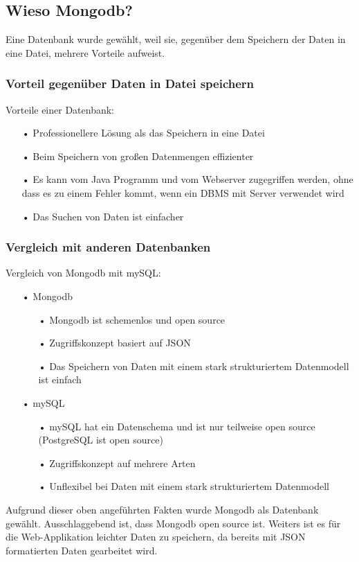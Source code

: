 \subsection{Wieso Mongodb?}
Eine Datenbank wurde gewählt, weil sie, gegenüber dem Speichern der Daten in eine Datei, mehrere Vorteile aufweist. 
\subsubsection{Vorteil gegenüber Daten in Datei speichern}
Vorteile einer Datenbank:
\begin{itemize}
\item[•] Professionellere Lösung als das Speichern in eine Datei
\item[•] Beim Speichern von großen Datenmengen effizienter
\item[•] Es kann vom Java Programm und vom Webserver zugegriffen werden, ohne dass es zu einem Fehler kommt, wenn ein DBMS mit Server verwendet wird
\item[•] Das Suchen von Daten ist einfacher
\end{itemize}
\subsubsection{Vergleich mit anderen Datenbanken}
Vergleich von Mongodb mit mySQL:
\begin{itemize}
\item[•] Mongodb
\begin{itemize}
\item[•] Mongodb ist schemenlos und open source
\item[•] Zugriffskonzept basiert auf \ac{JSON}
\item[•] Das Speichern von Daten mit einem stark strukturiertem Datenmodell ist einfach
\end{itemize}
\item[•] mySQL
\begin{itemize}
\item[•] mySQL hat ein Datenschema und ist nur teilweise open source (PostgreSQL ist open source)
\item[•] Zugriffskonzept auf mehrere Arten
\item[•] Unflexibel bei Daten mit einem stark strukturiertem Datenmodell
\end{itemize}
\end{itemize}

Aufgrund dieser oben angeführten Fakten wurde Mongodb als Datenbank gewählt. Ausschlaggebend ist, dass Mongodb open source ist. Weiters ist es für die Web-Applikation leichter Daten zu speichern, da bereits mit \ac{JSON} formatierten Daten gearbeitet wird.

